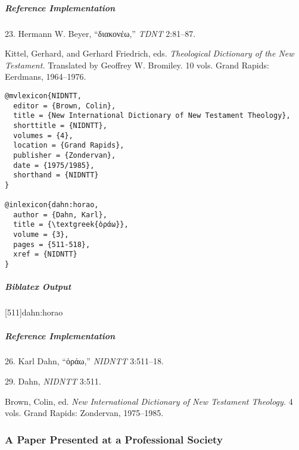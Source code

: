 \documentclass[a4paper]{article}
\newcommand{\textgreek}[1]{{\greekfont #1}}
\newenvironment{biboutput}{%
  \subparagraph{Biblatex Output}
}{\color{black}}
\newenvironment{refimp}{%
  \subparagraph{Reference Implementation}
  \color{reference-colour}
  \rm
}{\par\color{black}}
\begin{document}
\begin{refimp}
  \hspace*{\bibindent}23. Hermann W. Beyer, “\textgreek{διακονέω},” \emph{TDNT}
  2:81–87.

  \hangindent\bibindent Kittel, Gerhard, and Gerhard Friedrich, eds.
  \emph{Theological Dictionary of the New Testament.} Translated by Geoffrey
  W. Bromiley. 10 vols. Grand Rapids: Eerdmans, 1964–1976.

\end{refimp}

\medskip

\begin{lstlisting}
@mvlexicon{NIDNTT,
  editor = {Brown, Colin},
  title = {New International Dictionary of New Testament Theology},
  shorttitle = {NIDNTT},
  volumes = {4},
  location = {Grand Rapids},
  publisher = {Zondervan},
  date = {1975/1985},
  shorthand = {NIDNTT}
}

@inlexicon{dahn:horao,
  author = {Dahn, Karl},
  title = {\textgreek{ὁράω}},
  volume = {3},
  pages = {511-518},
  xref = {NIDNTT}
}
\end{lstlisting}

\begin{biboutput}
  [511]{dahn:horao}
\end{biboutput}

\begin{refimp}
  \hspace*{\bibindent}26. Karl Dahn, “\textgreek{ὁράω},” \emph{NIDNTT} 3:511–18.

  \hspace*{\bibindent}29. Dahn, \emph{NIDNTT} 3:511.

  \hangindent\bibindent Brown, Colin, ed. \emph{New International Dictionary
  of New Testament Theology.} 4 vols. Grand Rapids: Zondervan, 1975–1985.

\end{refimp}

\subsubsection{A Paper Presented at a Professional Society}
\end{document}
